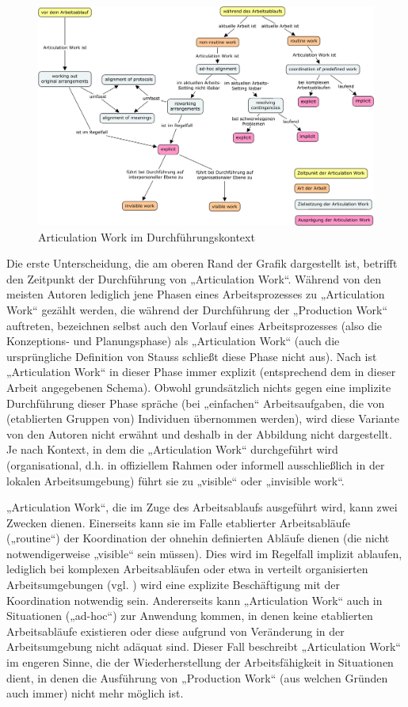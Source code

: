\begin{figure}[htbp]
	\centering
		\includegraphics[width=15cm]{img/ArticulationWork/aw_conceptual_structure.png}
	\caption{Articulation Work im Durchführungskontext}
	\label{fig:img_ArticulationWork_aw_conceptual_structure}
\end{figure}

Die erste Unterscheidung, die am oberen Rand der Grafik dargestellt ist, betrifft den Zeitpunkt der Durchführung von „Articulation Work“. Während von den meisten Autoren lediglich jene Phasen eines Arbeitsprozesses zu „Articulation Work“ gezählt werden, die während der Durchführung der „Production Work“ auftreten, bezeichnen \citet{Corbin93} selbst auch den Vorlauf eines Arbeitsprozesses (also die Konzeptions- und Planungsphase) als „Articulation Work“ (auch die ursprüngliche Definition von Stauss schließt diese Phase nicht aus). Nach \citet{Corbin93} ist „Articulation Work“ in dieser Phase immer explizit (entsprechend dem in dieser Arbeit angegebenen Schema). Obwohl grundsätzlich nichts gegen eine implizite Durchführung dieser Phase spräche (bei „einfachen“ Arbeitsaufgaben, die von (etablierten Gruppen von) Individuen übernommen werden), wird diese Variante von den Autoren nicht erwähnt und deshalb in der Abbildung nicht dargestellt. Je nach Kontext, in dem die „Articulation Work“ durchgeführt wird (organisational, d.h. in offiziellem Rahmen oder informell ausschließlich in der lokalen Arbeitsumgebung) führt sie zu „visible“ oder „invisible work“.

„Articulation Work“, die im Zuge des Arbeitsablaufs ausgeführt wird, kann zwei Zwecken dienen. Einerseits kann sie im Falle etablierter Arbeitsabläufe („routine“) der Koordination der ohnehin definierten Abläufe dienen (die nicht notwendigerweise „visible“ sein müssen). Dies wird im Regelfall implizit ablaufen, lediglich bei komplexen Arbeitsabläufen oder etwa in verteilt organisierten Arbeitsumgebungen (vgl. \citep{Carstensen99}) wird eine explizite Beschäftigung mit der Koordination notwendig sein. Andererseits kann „Articulation Work“ auch in Situationen („ad-hoc“) zur Anwendung kommen, in denen keine etablierten Arbeitsabläufe existieren oder diese aufgrund von Veränderung in der Arbeitsumgebung nicht adäquat sind. Dieser Fall beschreibt „Articulation Work“ im engeren Sinne, die der Wiederherstellung der Arbeitsfähigkeit in Situationen dient, in denen die Ausführung von „Production Work“ (aus welchen Gründen auch immer) nicht mehr möglich ist.

